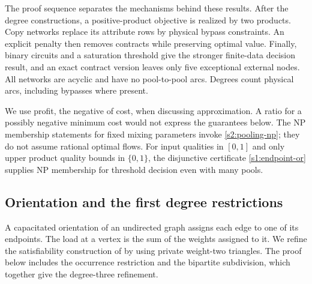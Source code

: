 The proof sequence separates the mechanisms behind these results.
After the degree constructions, a positive-product objective is realized
by two products. Copy networks replace its attribute rows by physical
bypass constraints. An explicit penalty then removes contracts while
preserving optimal value. Finally, binary circuits and a saturation
threshold give the stronger finite-data decision result, and an exact
contract version leaves only five exceptional external nodes.
All networks are acyclic and have no pool-to-pool arcs. Degrees count
physical arcs, including bypasses where present.

We use profit, the negative of cost, when discussing approximation. A ratio
for a possibly negative minimum cost would not express the guarantees below.
The NP membership statements for fixed mixing parameters invoke
\cref{s2:pooling-np}; they do not assume rational optimal flows. For
input qualities in $[0,1]$ and only upper product quality bounds in
$\{0,1\}$, the disjunctive certificate \eqref{s1:endpoint-or} supplies
NP membership for threshold decision even with many pools.

\subsection{Orientation and the first degree restrictions}\label{s3:orientation}

A capacitated orientation of an undirected graph assigns each edge to one
of its endpoints. The load at a vertex is the sum of the weights assigned
to it. We refine the satisfiability construction of
\citet[Section~5]{s3:asahiro2011} by using private weight-two triangles.
The proof below includes the occurrence restriction and the bipartite
subdivision, which together give the degree-three refinement.

